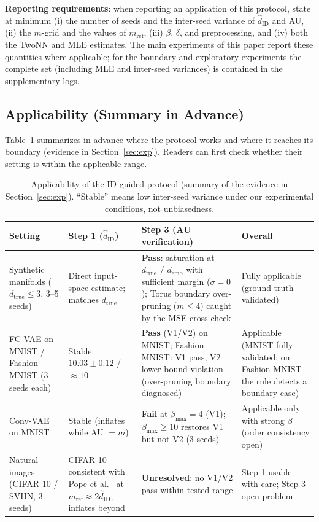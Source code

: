 \documentclass[make,article,submit,pdftex,moreauthors]{Definitions/mdpi}
\newcommand{\hatdID}{\hat{d}_{\mathrm{ID}}}
\newcommand{\dtrue}{d_{\mathrm{true}}}
\newcommand{\demb}{d_{\mathrm{emb}}}
\begin{document}
\textbf{Reporting requirements}:
when reporting an application of this protocol, state at minimum
(i) the number of seeds and the inter-seed variance of $\hatdID$ and AU,
(ii) the $m$-grid and the values of $m_{\mathrm{ref}}$,
(iii) $\beta$, $\delta$, and preprocessing, and
(iv) both the TwoNN and MLE estimates.
The main experiments of this paper report these quantities where
applicable; for the boundary and exploratory experiments the complete set
(including MLE and inter-seed variances) is contained in the supplementary
logs.

\subsection{Applicability (Summary in Advance)}\label{sec:protocol_applicability}

Table~\ref{tab:applicability} summarizes in advance where the protocol works
and where it reaches its boundary (evidence in Section~\ref{sec:exp}).
Readers can first check whether their setting is within the applicable
range.

\begin{table}[H]
\caption{Applicability of the ID-guided protocol (summary of the evidence in
Section~\ref{sec:exp}). ``Stable'' means low inter-seed variance under our
experimental conditions, not unbiasedness.}
\label{tab:applicability}
\small
\begin{tabular}{p{2.6cm}p{2.9cm}p{3.1cm}p{3.6cm}}
\toprule
\textbf{Setting} & \textbf{Step 1 ($\hatdID$)} & \textbf{Step 3 (AU verification)} & \textbf{Overall} \\
\midrule
Synthetic manifolds ($\dtrue \leq 3$, 3--5 seeds) & Direct input-space estimate; matches $\dtrue$ & \textbf{Pass}: saturation at $\dtrue$ / $\demb$ with sufficient margin ($\sigma = 0$); Torus boundary over-pruning ($m \leq 4$) caught by the MSE cross-check & Fully applicable (ground-truth validated) \\
\addlinespace
FC-VAE on MNIST / Fashion-MNIST (3 seeds each) & Stable: $10.03 \pm 0.12$ / $\approx 10$ & \textbf{Pass} (V1/V2) on MNIST; Fashion-MNIST: V1 pass, V2 lower-bound violation (over-pruning boundary diagnosed) & Applicable (MNIST fully validated; on Fashion-MNIST the rule detects a boundary case) \\
\addlinespace
Conv-VAE on MNIST & Stable (inflates while AU $= m$) & \textbf{Fail} at $\beta_{\max} = 4$ (V1); $\beta_{\max} \geq 10$ restores V1 but not V2 (3 seeds) & Applicable only with strong $\beta$ (order consistency open) \\
\addlinespace
Natural images (CIFAR-10 / SVHN, 3 seeds) & CIFAR-10 consistent with Pope et al.~\cite{pope2021intrinsic} at $m_{\mathrm{ref}} \approx 2\hatdID$; inflates beyond & \textbf{Unresolved}: no V1/V2 pass within tested range & Step 1 usable with care; Step 3 open problem \\
\bottomrule
\end{tabular}
\end{table}
\end{document}
